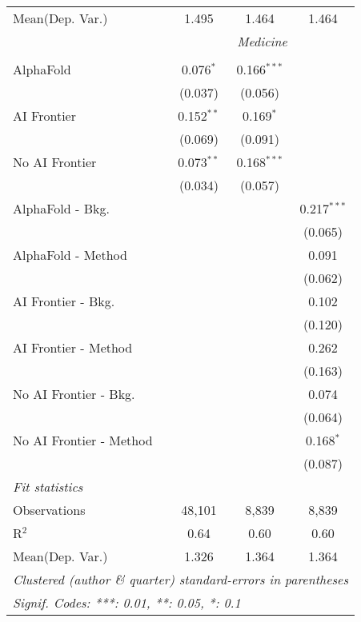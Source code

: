\begin{tabular}{lccc}
Mean(Dep. Var.) & 1.495 & 1.464 & 1.464 \\
 & \multicolumn{3}{c}{\textit{Medicine}} \\ \\
   AlphaFold               & 0.076$^{*}$  & 0.166$^{***}$ &   \\   
                           & (0.037)      & (0.056)       &   \\   
   AI Frontier             & 0.152$^{**}$ & 0.169$^{*}$   &   \\   
                           & (0.069)      & (0.091)       &   \\   
   No AI Frontier          & 0.073$^{**}$ & 0.168$^{***}$ &   \\   
                           & (0.034)      & (0.057)       &   \\   
   AlphaFold - Bkg.        &              &               & 0.217$^{***}$\\   
                           &              &               & (0.065)\\   
   AlphaFold - Method      &              &               & 0.091\\   
                           &              &               & (0.062)\\   
   AI Frontier - Bkg.      &              &               & 0.102\\   
                           &              &               & (0.120)\\   
   AI Frontier - Method    &              &               & 0.262\\   
                           &              &               & (0.163)\\   
   No AI Frontier - Bkg.   &              &               & 0.074\\   
                           &              &               & (0.064)\\   
   No AI Frontier - Method &              &               & 0.168$^{*}$\\   
                           &              &               & (0.087)\\   
   \midrule
   \emph{Fit statistics}\\
   Observations            & 48,101       & 8,839         & 8,839\\  
   R$^2$                   & 0.64         & 0.60          & 0.60\\  
Mean(Dep. Var.) & 1.326 & 1.364 & 1.364 \\
   \midrule \midrule
   \multicolumn{4}{l}{\emph{Clustered (author \& quarter) standard-errors in parentheses}}\\
   \multicolumn{4}{l}{\emph{Signif. Codes: ***: 0.01, **: 0.05, *: 0.1}}\\
\end{tabular}
\par\endgroup
